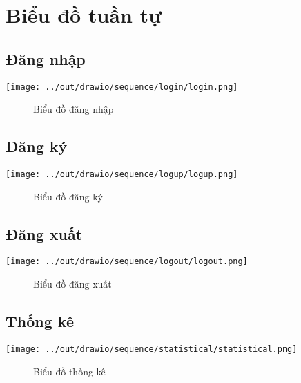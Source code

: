 \section{Biểu đồ tuần tự}

  \subsection*{Đăng nhập}
    \begin{center}
      \texttt{[image: ../out/drawio/sequence/login/login.png]}
      \begin{figure}[h]
        \centering
        \caption{Biểu đồ đăng nhập}
      \end{figure}
    \end{center}

  \subsection*{Đăng ký}
    \begin{center}
      \texttt{[image: ../out/drawio/sequence/logup/logup.png]}
      \begin{figure}[h]
        \centering
        \caption{Biểu đồ đăng ký}
      \end{figure}
    \end{center}

  \subsection*{Đăng xuất}
    \begin{center}
      \texttt{[image: ../out/drawio/sequence/logout/logout.png]}
      \begin{figure}[h]
        \centering
        \caption{Biểu đồ đăng xuất}
      \end{figure}
    \end{center}

  \subsection*{Thống kê}
    \begin{center}
      \texttt{[image: ../out/drawio/sequence/statistical/statistical.png]}
      \begin{figure}[h]
        \centering
        \caption{Biểu đồ thống kê}
      \end{figure}
    \end{center}

